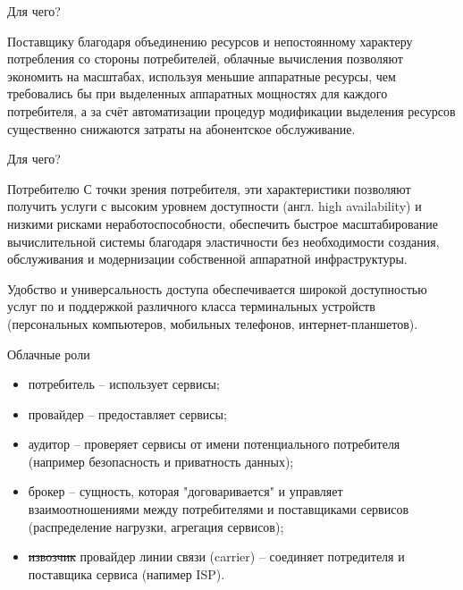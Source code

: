 \begin{frame}{Для чего?}
	\begin{block}{Поставщику}
благодаря объединению ресурсов и непостоянному характеру потребления со стороны потребителей,  облачные вычисления позволяют экономить на масштабах,  используя меньшие аппаратные ресурсы,  чем требовались бы при выделенных аппаратных мощностях для каждого потребителя,  а за счёт автоматизации процедур модификации выделения ресурсов существенно снижаются затраты на абонентское обслуживание.
	\end{block}
\end{frame}

\begin{frame}{Для чего?}
	\begin{block}{Потребителю}
С точки зрения потребителя,  эти характеристики позволяют получить услуги с высоким уровнем доступности (англ. high availability) и низкими рисками неработоспособности,  обеспечить быстрое масштабирование вычислительной системы благодаря эластичности без необходимости создания,  обслуживания и модернизации собственной аппаратной инфраструктуры.

Удобство и универсальность доступа обеспечивается широкой доступностью услуг по и поддержкой различного класса терминальных устройств (персональных компьютеров,  мобильных телефонов,  интернет-планшетов).
	\end{block}
\end{frame}

\begin{frame}{Облачные роли}
	\begin{itemize}
		\item потребитель -- использует сервисы;
		\item провайдер -- предоставляет сервисы;
		\item аудитор -- проверяет сервисы от имени потенциального потребителя (например безопасность и приватность данных);
		\item брокер -- сущность, которая "договаривается" и управляет взаимоотношениями между потребителями и поставщиками сервисов (распределение нагрузки, агрегация сервисов);
		\item \sout{извозчик} провайдер линии связи (carrier) -- соединяет потредителя и поставщика сервиса (напимер ISP).
	\end{itemize}
\end{frame}



